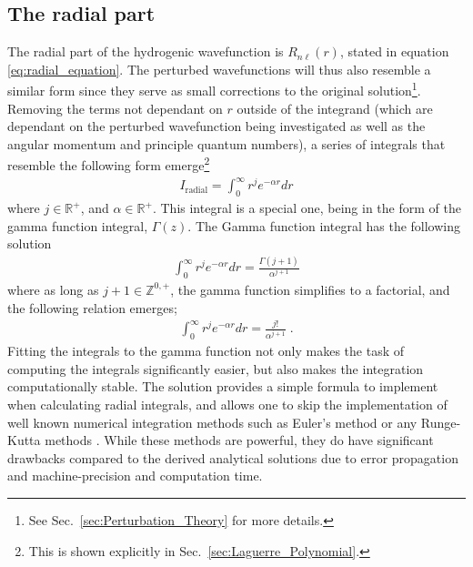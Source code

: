         \subsection{The radial part} \label{sec:The_Radial_Part}
            The radial part of the hydrogenic wavefunction is $R_{n\ell}(r)$, stated in equation \eqref{eq:radial_equation}. The perturbed wavefunctions will thus also resemble a similar form since they serve as small corrections to the original solution\footnote{See Sec.~\ref{sec:Perturbation_Theory} for more details.}. Removing the terms not dependant on $r$ outside of the integrand (which are dependant on the perturbed wavefunction being investigated as well as the angular momentum and principle quantum numbers), a series of integrals that resemble the following form emerge\footnote{This is shown explicitly in Sec.~\ref{sec:Laguerre_Polynomial}.}
            \begin{align}
                I_{\text{radial}} = \int_0^\infty r^j e^{-\alpha r} dr
            \end{align}
            \noindent where $j \in \mathbb{R^+}$, and $\alpha \in \mathbb{R^+}$. This integral is a special one, being in the form of the gamma function integral, $\Gamma(z)$. The Gamma function integral has the following solution 
            \begin{align}
                \int_0^\infty r^j e^{-\alpha r} dr = \frac{\Gamma(j + 1)}{\alpha^{j + 1}}
            \end{align}
            \noindent where as long as $j + 1 \in \mathbb{Z}^{0,+}$, the gamma function simplifies to a factorial, and the following relation emerges;
            \begin{align}
                \int_0^\infty r^j e^{-\alpha r} dr = \frac{j!}{\alpha^{j + 1}}\;.
            \end{align}
            \noindent Fitting the integrals to the gamma function not only makes the task of computing the integrals significantly easier, but also makes the integration computationally stable. The solution provides a simple formula to implement when calculating radial integrals, and allows one to skip the implementation of well known numerical integration methods such as Euler's method or any Runge-Kutta methods \cite{Numerical_recipes}. While these methods are powerful, they do have significant drawbacks compared to the derived analytical solutions due to error propagation and machine-precision and computation time.\\
            
